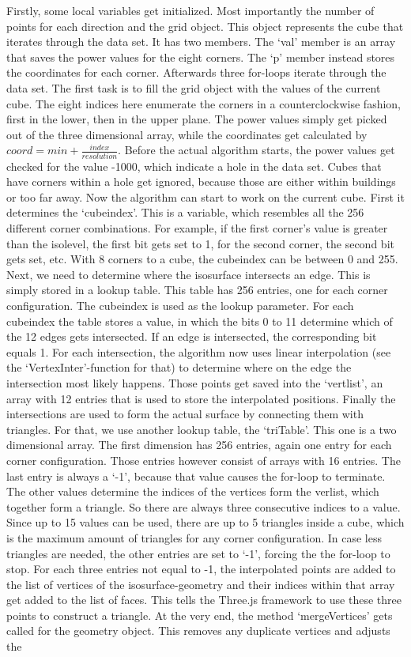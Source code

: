 Firstly, some local variables get initialized. Most importantly the number of points for each direction and the grid object. This object represents the cube that iterates through the data set. It has two members. The `val' member is an array that saves the power values for the eight corners. The `p' member instead stores the coordinates for each corner. Afterwards three for-loops iterate through the data set. The first task is to fill the grid object with the values of the current cube. The eight indices here enumerate the corners in a counterclockwise fashion, first in the lower, then in the upper plane. The power values simply get picked out of the three dimensional array, while the coordinates get calculated by $coord = min + \frac{index}{resolution}$. Before the actual algorithm starts, the power values get checked for the value -1000, which indicate a hole in the data set. Cubes that have corners within a hole get ignored, because those are either within buildings or too far away. Now the algorithm can start to work on the current cube. First it determines the `cubeindex'. This is a variable, which resembles all the 256 different corner combinations. For example, if the first corner's value is greater than the isolevel, the first bit gets set to 1, for the second corner, the second bit gets set, etc. With 8 corners to a cube, the cubeindex can be between 0 and 255. Next, we need to determine where the isosurface intersects an edge. This is simply stored in a lookup table. This table has 256 entries, one for each corner configuration. The cubeindex is used as the lookup parameter. For each cubeindex the table stores a value, in which the bits 0 to 11 determine which of the 12 edges gets intersected. If an edge is intersected, the corresponding bit equals 1. For each intersection, the algorithm now uses linear interpolation (see the `VertexInter'-function for that) to determine where on the edge the intersection most likely happens. Those points get saved into the `vertlist', an array with 12 entries that is used to store the interpolated positions. Finally the intersections are used to form the actual surface by connecting them with triangles. For that, we use another lookup table, the `triTable'. This one is a two dimensional array. The first dimension has 256 entries, again one entry for each corner configuration. Those entries however consist of arrays with 16 entries. The last entry is always a `-1', because that value causes the for-loop to terminate. The other values determine the indices of the vertices form the verlist, which together form a triangle. So there are always three consecutive indices to a value. Since up to 15 values can be used, there are up to 5 triangles inside a cube, which is the maximum amount of triangles for any corner configuration. In case less triangles are needed, the other entries are set to `-1', forcing the the for-loop to stop. For each three entries not equal to -1, the interpolated points are added to the list of vertices of the isosurface-geometry and their indices within that array get added to the list of faces. This tells the Three.js framework to use these three points to construct a triangle. At the very end, the method `mergeVertices' gets called for the geometry object. This removes any duplicate vertices and adjusts the 
